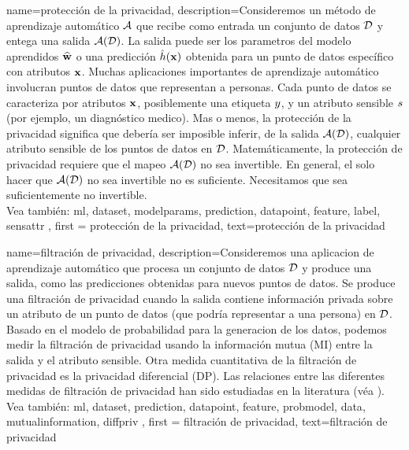 {name=protección de la privacidad,
    description={Consideremos un método de aprendizaje automático $\mathcal{A}$ que recibe como entrada 
	 un conjunto de datos $\mathcal{D}$ y entega una salida $\mathcal{A}(\mathcal{D})$. La salida 
	 puede ser los parametros del modelo aprendidos $\widehat{{\bf w}}$ o una predicción
	 $\hat{h}({\bf x})$ obtenida para un punto de datos específico con atributos
	 ${\bf x}$. Muchas aplicaciones importantes de aprendizaje automático involucran puntos de datos 
		que representan a personas. Cada punto de datos se caracteriza por atributos ${\bf x}$, 
		posiblemente una etiqueta $y$, y un atributo sensible $s$ (por ejemplo, un diagnóstico medico). 
		Mas o menos, la protección de la privacidad significa que debería ser imposible inferir, de la salida $\mathcal{A}(\mathcal{D})$, 
		cualquier atributo sensible de los puntos de datos en $\mathcal{D}$. Matemáticamente, la protección de privacidad requiere que  
		el mapeo $\mathcal{A}(\mathcal{D})$ no sea invertible. En general, el solo hacer que  $\mathcal{A}(\mathcal{D})$ no sea invertible 
		no es suficiente. Necesitamos que sea suficientemente no invertible. 
		\\
		Vea también:  \gls{ml}, \gls{dataset}, \glspl{modelparam}, \gls{prediction}, \gls{datapoint}, \gls{feature}, \gls{label}, \gls{sensattr} }, 
	first = {protección de la privacidad}, text={protección de la privacidad} 
}

{
	name=filtración de privacidad,
	description={Consideremos una aplicacion de aprendizaje automático que procesa un
	conjunto de datos $\mathcal{D}$ y produce una salida, como las predicciones
	obtenidas para nuevos puntos de datos. Se produce una filtración de privacidad 
	cuando la salida contiene información privada sobre un atributo de un 
	punto de datos (que podría representar a una persona) en $\mathcal{D}$. Basado en el modelo de probabilidad
	para la generacion de los datos, podemos medir la filtración de privacidad usando la información mutua (MI)
	entre la salida y el atributo sensible. Otra medida cuantitativa de la filtración de privacidad 
	es la privacidad diferencial (DP). Las relaciones entre las diferentes medidas de filtración de privacidad han sido estudiadas en la literatura (véa \cite{InfThDiffPriv}). 
	\\
		Vea también: \gls{ml}, \gls{dataset}, \gls{prediction}, \gls{datapoint},  \gls{feature}, \gls{probmodel}, \gls{data}, \gls{mutualinformation}, \gls{diffpriv} }, 
	first = {filtración de privacidad}, text={filtración de privacidad} 
}




